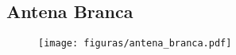 \begin{apendicesenv}
\chapter{Antena Branca}
\begin{figure}[H]
    \centering
    \texttt{[image: figuras/antena\_branca.pdf]}
    \label{processamento_imagem1}
\end{figure}












\end{apendicesenv}